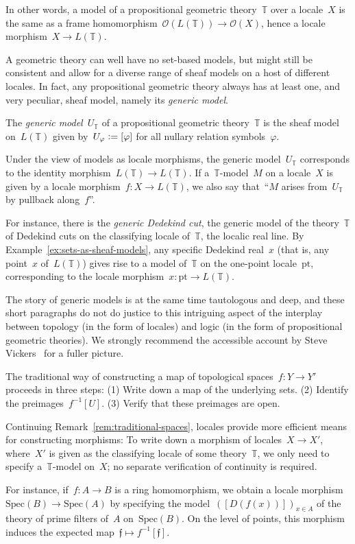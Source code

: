 \documentclass{ws-rv9x6}
\renewcommand{\O}{\mathcal{O}}
\newcommand{\TT}{\mathbb{T}}
\newcommand{\fff}{\mathfrak{f}}
\newcommand{\defeq}{\vcentcolon=}
\newcommand{\Spec}{\mathrm{Spec}}
\renewcommand{\_}{\mathpunct{.}}
\newcommand{\?}{\,{:}\,}
\newcommand{\pt}{\mathrm{pt}}
\begin{document}
In other words, a model of a propositional geometric theory~$\TT$ over a
locale~$X$ is the same as a frame homomorphism~$\O(L(\TT)) \to \O(X)$, hence a
locale morphism~$X \to L(\TT)$.

A geometric theory can well have no set-based models, but might still be
consistent and allow for a diverse range of sheaf models on a host of different
locales. In fact, any propositional geometric theory always has at least one,
and very peculiar, sheaf model, namely its \emph{generic model}.

\begin{definition}The \emph{generic model}~$U_\TT$ of a propositional geometric
theory~$\TT$ is the sheaf model on~$L(\TT)$ given by~$U_\varphi \defeq
[\varphi]$ for all nullary relation symbols~$\varphi$.\end{definition}

Under the view of models as locale morphisms, the generic model~$U_\TT$
corresponds to the identity morphism~$L(\TT) \to L(\TT)$. If a~$\TT$-model~$M$ on
a locale~$X$ is given by a locale morphism~$f : X \to L(\TT)$, we also say
that~``$M$ arises from~$U_\TT$ by pullback along~$f$''.

For instance, there is the \emph{generic Dedekind cut}, the generic model of
the theory~$\TT$ of Dedekind cuts on the classifying locale of~$\TT$, the
localic real line. By Example~\ref{ex:sets-as-sheaf-models}, any specific Dedekind
real~$x$ (that is, any point~$x$ of~$L(\TT)$) gives rise to a model of~$\TT$ on
the one-point locale~$\pt$, corresponding to the locale morphism~$x : \pt \to
L(\TT)$.

The story of generic models is at the same time tautologous and deep, and these
short paragraphs do not do justice to this intriguing aspect of the interplay
between topology (in the form of locales) and logic (in the form of
propositional geometric theories). We strongly
recommend the accessible account by Steve Vickers~\cite{vickers:continuity} for a fuller
picture.

\begin{remark}The traditional way of constructing a map of topological spaces~$f : Y \to
Y'$ proceeds in three steps: (1) Write down a map of the underlying sets. (2)
Identify the preimages~$f^{-1}[U]$. (3) Verify that these preimages are open.

Continuing Remark~\ref{rem:traditional-spaces}, locales provide more
efficient means for constructing morphisms: To write down a morphism of
locales~$X \to X'$, where~$X'$ is given as the classifying locale of some
theory~$\TT$, we only need to specify a~$\TT$-model on~$X$; no separate
verification of continuity is required.

For instance, if~$f : A \to B$ is a ring homomorphism, we obtain a locale
morphism~$\Spec(B) \to \Spec(A)$ by specifying the model~$([D(f(x))])_{x \in
A}$ of the theory of prime filters of~$A$ on~$\Spec(B)$. On the level of
points, this morphism induces the expected map~$\fff \mapsto f^{-1}[\fff]$.
\end{remark}
\end{document}

